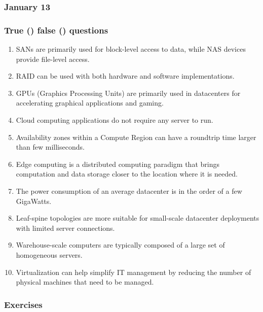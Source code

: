 \subsubsection{January 13}

\subsubsection*{True (\trueIcon) false (\falseIcon) questions}

\begin{enumerate}
    \item \trueIcon \: SANs are primarily used for block-level access to data, while NAS devices provide ﬁle-level access.
    \item \trueIcon \: RAID can be used with both hardware and software implementations.
    \item \falseIcon \: GPUs (Graphics Processing Units) are primarily used in datacenters for accelerating graphical applications and gaming.
    \item \falseIcon \: Cloud computing applications do not require any server to run.
    \item \falseIcon \: Availability zones within a Compute Region can have a roundtrip time larger than few milliseconds.
    \item \trueIcon \: Edge computing is a distributed computing paradigm that brings computation and data storage closer to the location where it is needed.
    \item \falseIcon \: The power consumption of an average datacenter is in the order of a few GigaWatts.
    \item \falseIcon \: Leaf-spine topologies are more suitable for small-scale datacenter deployments with limited server connections.
    \item \trueIcon \: Warehouse-scale computers are typically composed of a large set of homogeneous servers.
    \item \trueIcon \: Virtualization can help simplify IT management by reducing the number of physical machines that need to be managed.
\end{enumerate}

\newpage

\subsubsection*{Exercises}


